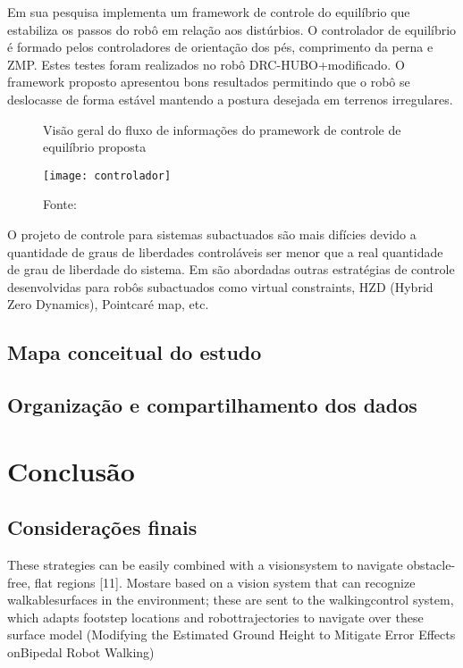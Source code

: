 Em sua pesquisa \cite{Joe2019} implementa um framework de controle do equilíbrio que estabiliza os passos do robô em relação aos distúrbios. O controlador de equilíbrio é formado pelos controladores de orientação dos pés, comprimento da perna e ZMP. Estes testes foram realizados no robô DRC-HUBO+modificado. O framework proposto apresentou bons resultados permitindo que o robô se deslocasse de forma estável mantendo a postura desejada em terrenos irregulares.


\begin{figure} [H]
    \centering
    \caption{Visão geral do fluxo de informações do pramework de controle de equilíbrio proposta}
    \texttt{[image: controlador]}
    \caption*{Fonte: \cite{Joe2019}}
    \label{fig:framework-control}
\end{figure}


O projeto de controle para sistemas subactuados são mais difícies devido a quantidade de graus de liberdades controláveis ser menor que a real quantidade de grau de liberdade do sistema. Em \cite{Gupta2017607} são abordadas outras estratégias de controle desenvolvidas para robôs subactuados como virtual constraints, HZD (Hybrid Zero Dynamics), Pointcaré map, etc.




\section{Mapa conceitual do estudo}
\label{sec:mapa}




\section{Organização e compartilhamento dos dados}
\label{sec:org}



\chapter{Conclusão}
\label{chap:conclu}


\section{Considerações finais}
\label{sec:consider}



These strategies can be easily combined with a visionsystem  to  navigate  obstacle-free,  flat  regions  [11].  Mostare  based  on  a  vision  system  that  can  recognize  walkablesurfaces  in  the  environment;  these  are  sent  to  the  walkingcontrol  system,  which  adapts  footstep  locations  and  robottrajectories to navigate over these surface model (Modifying the Estimated Ground Height to Mitigate Error Effects onBipedal Robot Walking)